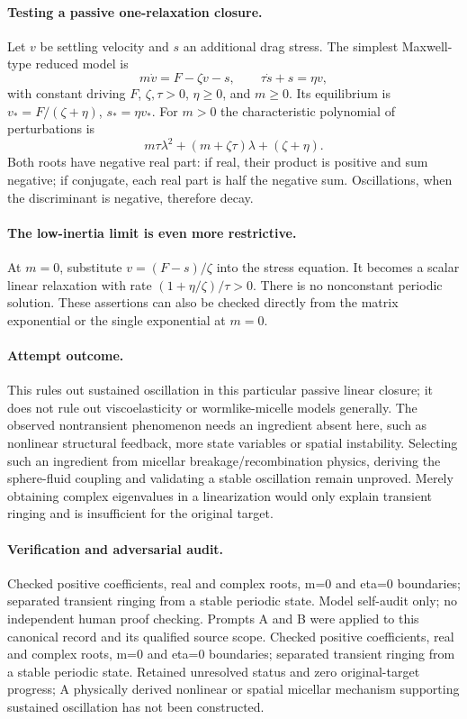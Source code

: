 \documentclass[11pt]{article}
\begin{document}
\paragraph{Testing a passive one-relaxation closure.} Let $v$ be settling velocity and $s$ an additional drag stress. The simplest Maxwell-type reduced model is
\[
 m\dot v=F-\zeta v-s,\qquad \tau\dot s+s=\eta v,
\]
with constant driving $F$, $\zeta,\tau>0$, $\eta\geq0$, and $m\geq0$. Its equilibrium is $v_*=F/(\zeta+\eta)$, $s_*=\eta v_*$. For $m>0$ the characteristic polynomial of perturbations is
\[
 m\tau\lambda^2+(m+\zeta\tau)\lambda+(\zeta+\eta).
\]
Both roots have negative real part: if real, their product is positive and sum negative; if conjugate, each real part is half the negative sum. Oscillations, when the discriminant is negative, therefore decay.

\paragraph{The low-inertia limit is even more restrictive.} At $m=0$, substitute $v=(F-s)/\zeta$ into the stress equation. It becomes a scalar linear relaxation with rate $(1+\eta/\zeta)/\tau>0$. There is no nonconstant periodic solution. These assertions can also be checked directly from the matrix exponential or the single exponential at $m=0$.

\paragraph{Attempt outcome.} This rules out sustained oscillation in this particular passive linear closure; it does not rule out viscoelasticity or wormlike-micelle models generally. The observed nontransient phenomenon needs an ingredient absent here, such as nonlinear structural feedback, more state variables or spatial instability. Selecting such an ingredient from micellar breakage/recombination physics, deriving the sphere-fluid coupling and validating a stable oscillation remain unproved. Merely obtaining complex eigenvalues in a linearization would only explain transient ringing and is insufficient for the original target.

\paragraph{Verification and adversarial audit.}
Checked positive coefficients, real and complex roots, m=0 and eta=0 boundaries; separated transient ringing from a stable periodic state. Model self-audit only; no independent human proof checking. Prompts A and B were applied to this canonical record and its qualified source scope. Checked positive coefficients, real and complex roots, m=0 and eta=0 boundaries; separated transient ringing from a stable periodic state. Retained unresolved status and zero original-target progress; A physically derived nonlinear or spatial micellar mechanism supporting sustained oscillation has not been constructed.
\end{document}
